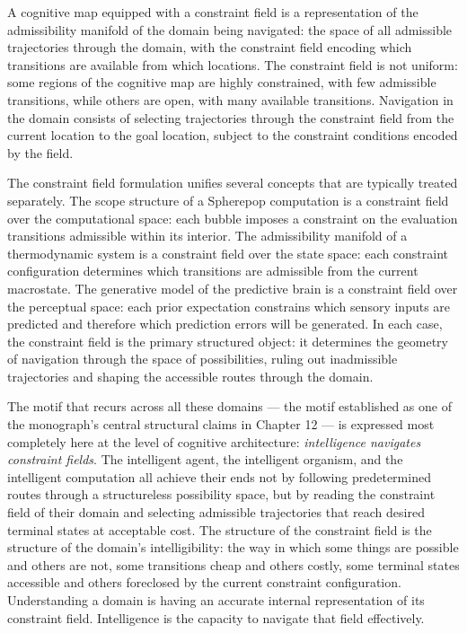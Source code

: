 \documentclass[12pt,openany]{book}
\theoremstyle{plain}
\theoremstyle{definition}
\theoremstyle{remark}
\begin{document}
A cognitive map equipped with a constraint field is a representation of the admissibility manifold of the domain being navigated: the space of all admissible trajectories through the domain, with the constraint field encoding which transitions are available from which locations. The constraint field is not uniform: some regions of the cognitive map are highly constrained, with few admissible transitions, while others are open, with many available transitions. Navigation in the domain consists of selecting trajectories through the constraint field from the current location to the goal location, subject to the constraint conditions encoded by the field.

The constraint field formulation unifies several concepts that are typically treated separately. The scope structure of a Spherepop computation is a constraint field over the computational space: each bubble imposes a constraint on the evaluation transitions admissible within its interior. The admissibility manifold of a thermodynamic system is a constraint field over the state space: each constraint configuration determines which transitions are admissible from the current macrostate. The generative model of the predictive brain is a constraint field over the perceptual space: each prior expectation constrains which sensory inputs are predicted and therefore which prediction errors will be generated. In each case, the constraint field is the primary structured object: it determines the geometry of navigation through the space of possibilities, ruling out inadmissible trajectories and shaping the accessible routes through the domain.

The motif that recurs across all these domains — the motif established as one of the monograph's central structural claims in Chapter 12 — is expressed most completely here at the level of cognitive architecture: \emph{intelligence navigates constraint fields}. The intelligent agent, the intelligent organism, and the intelligent computation all achieve their ends not by following predetermined routes through a structureless possibility space, but by reading the constraint field of their domain and selecting admissible trajectories that reach desired terminal states at acceptable cost. The structure of the constraint field is the structure of the domain's intelligibility: the way in which some things are possible and others are not, some transitions cheap and others costly, some terminal states accessible and others foreclosed by the current constraint configuration. Understanding a domain is having an accurate internal representation of its constraint field. Intelligence is the capacity to navigate that field effectively.
\end{document}
